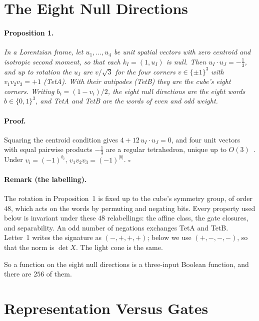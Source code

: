 \documentclass[twocolumn]{iopjournal}
\begin{document}
\section{The Eight Null Directions}

\paragraph{Proposition 1.} \textit{In a Lorentzian frame, let
$u_1,\dots,u_4$ be unit spatial vectors with zero centroid and
isotropic second moment, so that each $k_I = (1, u_I)$ is null. Then
$u_I\cdot u_J = -\tfrac13$, and up to rotation the $u_I$ are $v/\sqrt3$
for the four corners $v \in \{\pm1\}^3$ with $v_1v_2v_3 = +1$ (TetA).
With their antipodes (TetB) they are the cube's eight corners. Writing
$b_i = (1 - v_i)/2$, the eight null directions are the eight words
$b \in \{0,1\}^3$, and TetA and TetB are the words of even and odd
weight.}

\paragraph{Proof.} Squaring the centroid condition gives
$4 + 12\,u_I\cdot u_J = 0$, and four unit vectors with equal pairwise
products $-\tfrac13$ are a regular tetrahedron, unique up to
$O(3)$~\cite{NelsonL1}. Under $v_i = (-1)^{b_i}$,
$v_1v_2v_3 = (-1)^{|b|}$. \hfill $\square$

\paragraph{Remark (the labelling).} The rotation in Proposition~1 is
fixed up to the cube's symmetry group, of order $48$, which acts on the
words by permuting and negating bits. Every property used below is
invariant under these $48$ relabellings: the affine class, the gate
closures, and separability. An odd number of negations exchanges TetA
and TetB. Letter~1 writes the signature as $(-,+,+,+)$; below we use
$(+,-,-,-)$, so that the norm is $\det X$. The light cone is the same.

So a function on the eight null directions is a three-input Boolean
function, and there are $256$ of them.


\section{Representation Versus Gates}
\end{document}

